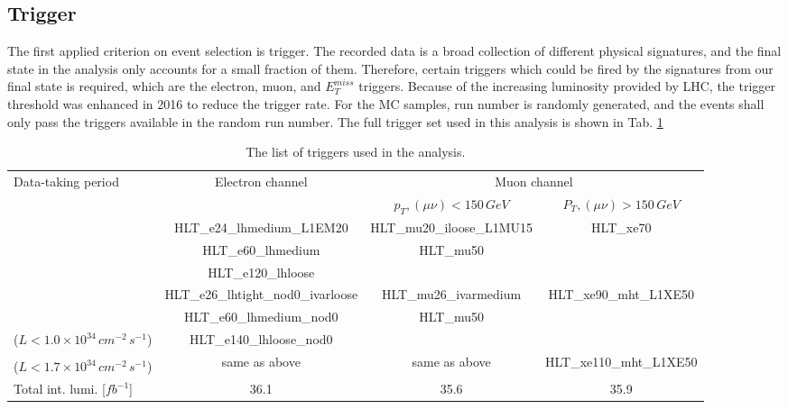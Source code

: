 \subsection{Trigger}
\label{Subsec:Trigger_resonance}
The first applied criterion on event selection is trigger. The recorded data is a broad collection of different physical signatures, and the final state in the analysis only accounts for a small fraction of them. Therefore, certain triggers which could be fired by the signatures from our final state is required, which are the electron, muon, and $E^{miss}_{T}$ triggers. Because of the increasing luminosity provided by LHC, the trigger threshold was enhanced in 2016 to reduce the trigger rate. For the MC samples, run number is randomly generated, and the events shall only pass the triggers available in the random run number. The full trigger set used in this analysis is shown in Tab. \ref{tab:triggers}
\begin{table}[h]
	\caption{The list of triggers used in the analysis.} \label{tab:triggers}
	
		\footnotesize
		\begin{center}
		\begin{adjustbox}{center}
			\begin{tabular}{|l|c|c|c|}
				\hline
				\multirow{2}{*}{Data-taking period} & \multirow{2}{*}{Electron channel} & \multicolumn{2}{c|}{ Muon channel }  \\
				\cline{3-4}
				& & $p_{T},\left(\mu\nu\right) < 150\,GeV$ & $P_{T},\left(\mu\nu\right) > 150\,GeV$   \\
				\hline
				\multirow{3}{*}{\centering {2015}} & HLT\_e24\_lhmedium\_L1EM20 & HLT\_mu20\_iloose\_L1MU15 & \multirow{3}{*}{ HLT\_xe70 } \\
				& HLT\_e60\_lhmedium  & HLT\_mu50 & \\
				& HLT\_e120\_lhloose & & \\
				\hline
				\multirow{2}{*}{\centering {2016a (run $< 302919$)}} & HLT\_e26\_lhtight\_nod0\_ivarloose & HLT\_mu26\_ivarmedium  & \multirow{3}{*}{ HLT\_xe90\_mht\_L1XE50 } \\
				& HLT\_e60\_lhmedium\_nod0 & HLT\_mu50 &  \\
				($L<1.0\times10^{34}\,{ cm}^{-2}\,{s}^{-1}$) & HLT\_e140\_lhloose\_nod0 & & \\
				\hline
				{\centering {2016b (run $\geq 302919$)}} & \multirow{2}{*}{same as above} & \multirow{2}{*}{same as above}  &  \multirow{2}{*}{HLT\_xe110\_mht\_L1XE50} \\
				($L<1.7\times10^{34}\,{ cm}^{-2}\,{ s}^{-1}$) & & &\\
				\hline
				\hline
				Total int. lumi. [$fb^{-1}$] &  36.1 & 35.6 & 35.9 \\
				\hline
			\end{tabular}
		\end{adjustbox}
		\end{center}
	
\end{table}
